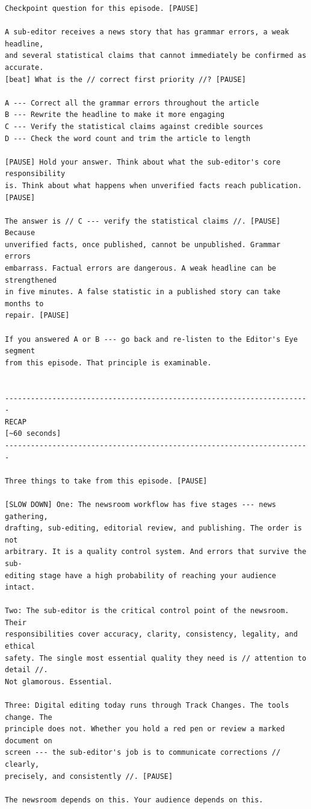 {\begin{Verbatim}
Checkpoint question for this episode. [PAUSE]

A sub-editor receives a news story that has grammar errors, a weak headline,
and several statistical claims that cannot immediately be confirmed as accurate.
[beat] What is the // correct first priority //? [PAUSE]

A --- Correct all the grammar errors throughout the article
B --- Rewrite the headline to make it more engaging
C --- Verify the statistical claims against credible sources
D --- Check the word count and trim the article to length

[PAUSE] Hold your answer. Think about what the sub-editor's core responsibility
is. Think about what happens when unverified facts reach publication. [PAUSE]

The answer is // C --- verify the statistical claims //. [PAUSE] Because
unverified facts, once published, cannot be unpublished. Grammar errors
embarrass. Factual errors are dangerous. A weak headline can be strengthened
in five minutes. A false statistic in a published story can take months to
repair. [PAUSE]

If you answered A or B --- go back and re-listen to the Editor's Eye segment
from this episode. That principle is examinable.


-----------------------------------------------------------------------
RECAP
[~60 seconds]
-----------------------------------------------------------------------

Three things to take from this episode. [PAUSE]

[SLOW DOWN] One: The newsroom workflow has five stages --- news gathering,
drafting, sub-editing, editorial review, and publishing. The order is not
arbitrary. It is a quality control system. And errors that survive the sub-
editing stage have a high probability of reaching your audience intact.

Two: The sub-editor is the critical control point of the newsroom. Their
responsibilities cover accuracy, clarity, consistency, legality, and ethical
safety. The single most essential quality they need is // attention to detail //.
Not glamorous. Essential.

Three: Digital editing today runs through Track Changes. The tools change. The
principle does not. Whether you hold a red pen or review a marked document on
screen --- the sub-editor's job is to communicate corrections // clearly,
precisely, and consistently //. [PAUSE]

The newsroom depends on this. Your audience depends on this.



\end{Verbatim}}
